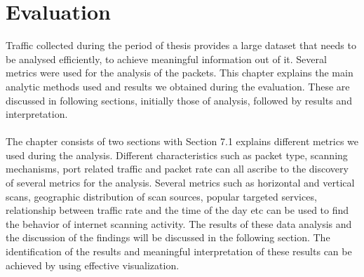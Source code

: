 \chapter{Evaluation}
Traffic collected during the period of thesis provides a large dataset that needs to be analysed efficiently, to achieve meaningful information out of it.
Several metrics were used for the analysis of the packets.
This chapter explains the main analytic methods used and results we obtained during the evaluation.
These are discussed in following sections, initially those of analysis, followed by results and interpretation.\\\\
The chapter consists of two sections with Section 7.1 explains different metrics we used during the analysis.
Different characteristics such as packet type, scanning mechanisms, port related traffic and packet rate can all ascribe to the discovery of several metrics for the analysis.
Several metrics such as horizontal and vertical scans, geographic distribution of scan sources, popular targeted services, relationship between traffic rate and the time of the day etc can be used to find the behavior of internet scanning activity.
The results of these data analysis and the discussion of the findings will be discussed in the following section.
The identification of the results and meaningful interpretation of these results can be achieved by using effective visualization.

